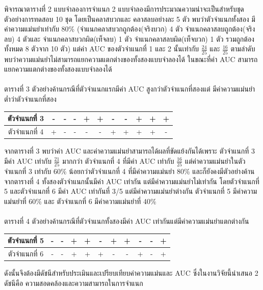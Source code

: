 \documentclass[twoside, twocolumn, 12pt]{article}
\begin{document}
พิจารณาตารางที่ 2 แบบจำลองการจำแนก 2 แบบจำลองมีการประมาณความน่าจะเป็นสำหรับชุดตัวอย่างการทดสอบ 10 ชุด โดยเป็นคลาสบวกและ คลาสลบอย่างละ 5 ตัว พบว่าตัวจำแนกทั้งสอง มีค่าความแม่นยำเท่ากับ 80\% (จำแนกคลาสบวกถูกต้อง(จริงบวก) 4 ตัว จำแนกคลาสลบถูกต้อง(จริงลบ) 4 ตัวและ จำแนกคลาสบวกผิด(เท็จลบ) 1 ตัว จำแนกคลาสลบผิด(เท็จบวก) 1 ตัว รวมถูกต้องทั้งหมด 8 ตัวจาก 10 ตัว) แต่ค่า AUC ของตัวจำแนกที่ 1 และ 2 นั้นเท่ากับ $\frac{24}{25}$ และ $\frac{16}{25}$ ตามลำดับ 
พบว่าความแม่นยำไม่สามารถแยกความแตกต่างของทั้งสองแบบจำลองได้ ในขณะที่ค่า AUC สามารถแยกความแตกต่างของทั้งสองแบบจำลองได้\\\\
ตารางที่ 3 ตัวอย่างค้านกรณีที่ตัวจำแนกแรกมีค่า AUC สูงกว่าตัวจำแนกที่สองแต่ มีค่าความแม่นยำต่ำว่าตัวจำแนกที่สอง
\begin{center}
\begin{tabular}{|c|ccccc|ccccc|}
  \hline
  ตัวจำแนกที่ 3 &-& -& -& +& +& -& -& +& +& +\\
  \hline
  ตัวจำแนกที่ 4 & +& -& -& -& -& +& +& +& +& -\\
  \hline  
\end{tabular}
\end{center}

จากตารางที่ 3 พบว่าค่า AUC และค่าความแม่นยำสามารถได้ผลที่ขัดแย้งกันได้เพราะ ตัวจำแนกที่ 3 มีค่า AUC เท่ากับ $\frac{21}{25}$ มากกว่า ตัวจำแนกที่ 4 ที่มีค่า AUC เท่ากับ $\frac{16}{25}$ แต่ค่าความแม่นยำในตัวจำแนกที่ 3 เท่ากับ 60\% น้อยกว่าตัวจำแนกที่ 4 ที่มีค่าความแม่นยำ 80\% และก็ยังคงมีตัวอย่างค้านจากตารางที่ 4 ทั้งสองตัวจำแนกนั้นมีค่า AUC เท่ากัน แต่มีค่าความแม่นยำไม่เท่ากัน โดยตัวจำแนกที่ 5 และตัวจำแนกที่ 6 มีค่า AUC เท่ากันที่ 3/5 แต่มีค่าความแม่นยำต่างกัน ตัวจำแนกที่ 5 มีค่าความแม่นยำที่ 60\% และ ตัวจำแนกที่ 6 มีค่าความแม่นยำที่ 40\% 
\\\\
ตารางที่ 4 ตัวอย่างค้านกรณีที่ตัวจำแนกทั้งสองมีค่า AUC เท่ากันแต่มีค่าความแม่นยำแตกต่างกัน\begin{center}
\begin{tabular}{|c|ccccc|ccccc|}
  \hline
  ตัวจำแนกที่ 5 & -& -& +& +& -& +& +& -& -& +\\
  \hline
  ตัวจำแนกที่ 6 & -& -& +& +& +& -& -& +& -& +\\
  \hline  
\end{tabular}
\end{center}

ดังนั้นจึงต้องมีดัชนีสำหรับประเมินและเปรียบเทียบค่าความแม่นและ AUC ซึ่งในงานวิจัยนี้นำเสนอ 2 ดัชนีคือ ความสอดคล้องและความสามารถในการจำแนก
\end{document}
